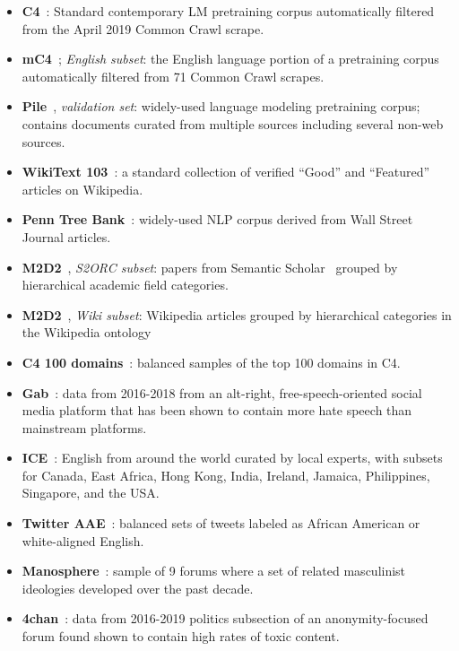 \documentclass{article}
\begin{document}
\begin{itemize}[leftmargin=1em]
    \item \textbf{C4}~\citep{raffel2020exploring,dodge-etal-2021-documenting}: Standard contemporary LM pretraining corpus automatically filtered from the April 2019 Common Crawl scrape.
    \item \textbf{mC4}~\citep{mc4}; \textit{English subset}: the English language portion of a pretraining corpus automatically filtered from 71 Common Crawl scrapes.
    \item \textbf{Pile}~\citep{Gao2020ThePA}, \textit{validation set}: widely-used language modeling pretraining corpus; 
    contains documents curated from multiple sources including several non-web sources.
    \item \textbf{WikiText 103}~\citep{merity2016pointer}: a standard collection of verified “Good” and “Featured” articles on Wikipedia.
    \item \textbf{Penn Tree Bank}~\citep{marcus-etal-1994-penn}: widely-used NLP corpus derived from Wall Street Journal articles.
    
    \item \textbf{M2D2}~\citep{reid-etal-2022-m2d2}, \textit{S2ORC subset}: papers from Semantic Scholar~\citep{lo-etal-2020-s2orc} grouped by hierarchical academic field categories.
    \item \textbf{M2D2}~\citep{reid-etal-2022-m2d2}, \textit{Wiki subset}: Wikipedia articles grouped by hierarchical categories in the Wikipedia ontology
    \item \textbf{C4 100 domains}~\citep{chronopoulou-etal-2022-efficient}: balanced samples of the top 100 domains in C4.
    \item \textbf{Gab}~\citep{zannettou2018gab}: data from 2016-2018 from an alt-right, free-speech-oriented social media platform that has been shown to contain more hate speech than mainstream platforms. 
    
    \item \textbf{ICE}~\citep{greenbaum1991ice}: English from around the world curated by local experts, with subsets for Canada, East Africa, Hong Kong, India, Ireland, Jamaica, Philippines, Singapore, and the USA.

    \item \textbf{Twitter AAE}~\citep{blodgett-etal-2016-demographic}: balanced sets of tweets labeled as African American or white-aligned English.
    \item \textbf{Manosphere}~\citep{ribeiroevolution2021}: sample of 9 forums where a set of related masculinist ideologies developed over the past decade.
    \item \textbf{4chan}~\citep{papasavva2020raiders}: data from 2016-2019 politics subsection of an anonymity-focused forum found shown to contain high rates of toxic content.
    
\end{itemize}
\end{document}
